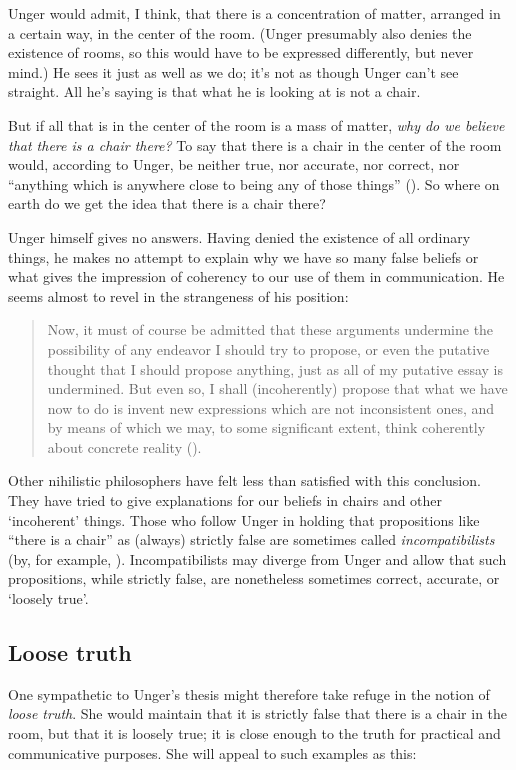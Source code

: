 \documentclass[11pt]{standalone} \newif\ifstandlone \standalonetrue
\newenvironment{squote}{%
	\begin{quote}\begin{singlespace}%
	}{%
	\end{singlespace}\end{quote}}
\begin{document}
\begin{spacing}{1.5}
Unger would admit, I think, that there is a concentration of matter,
arranged in a certain way, in the center of the room.  (Unger
presumably also denies the existence of rooms, so this would have to
be expressed differently, but never mind.)  He sees it just as well
as we do; it's not as though Unger can't see straight.  All he's
saying is that what he is looking at is not a chair.

But if all that is in the center of the room is a mass of matter, {\em
  why do we believe that there is a chair there?}  To say that there
is a chair in the center of the room would, according to Unger, be
neither true, nor accurate, nor correct, nor ``anything which is
anywhere close to being any of those things''
(\citeyear[148]{unger1979}).  So where on earth do we get the idea
that there is a chair there?

Unger himself gives no answers.  Having denied the existence of all
ordinary things, he makes no attempt to explain why we have so many
false beliefs or what gives the impression of coherency to our use of
them in communication.  He seems almost to revel in the strangeness of
his position:

\begin{squote}
Now, it must of course be admitted that these arguments
undermine the possibility of any endeavor I should try to propose, or
even the putative thought that I should propose anything, just as all
of my putative essay is undermined.  But even so, I shall
(incoherently) propose that what we have now to do is invent new
expressions which are not inconsistent ones, and by means of which we
may, to some significant extent, think coherently about concrete
reality (\citeyear[544]{unger1980b}).
\end{squote}

Other nihilistic philosophers have felt less than satisfied with this
conclusion.  They have tried to give explanations for our beliefs in
chairs and other `incoherent' things.  Those who follow Unger in
holding that propositions like ``there is a chair'' as (always)
strictly false are sometimes called {\em incompatibilists} (by, for
example, \citet{korman2009}).  Incompatibilists may diverge from Unger
and allow that such propositions, while strictly false, are
nonetheless sometimes correct, accurate, or `loosely true'.

\subsection{Loose truth}
\label{loose-u}
One sympathetic to Unger's thesis might therefore take refuge in the
notion of {\em loose truth}.  She would maintain that it is strictly
false that there is a chair in the room, but that it is loosely true;
it is close enough to the truth for practical and communicative
purposes.  She will appeal to such examples as this:


\end{spacing}
\end{document}
